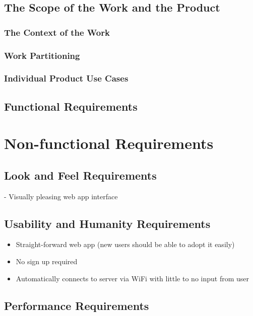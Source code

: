 \documentclass[12pt, titlepage]{article}
\begin{document}
\subsection{The Scope of the Work and the Product}

\subsubsection{The Context of the Work}

\subsubsection{Work Partitioning}

\subsubsection{Individual Product Use Cases}

\subsection{Functional Requirements}

\section{Non-functional Requirements}

\subsection{Look and Feel Requirements}

- Visually pleasing web app interface

\subsection{Usability and Humanity Requirements}

\begin{itemize}
\item Straight-forward web app (new users should be able to adopt it easily)
\item No sign up required
\item Automatically connects to server via WiFi with little to no input from user
\end{itemize}
\subsection{Performance Requirements}
\end{document}
